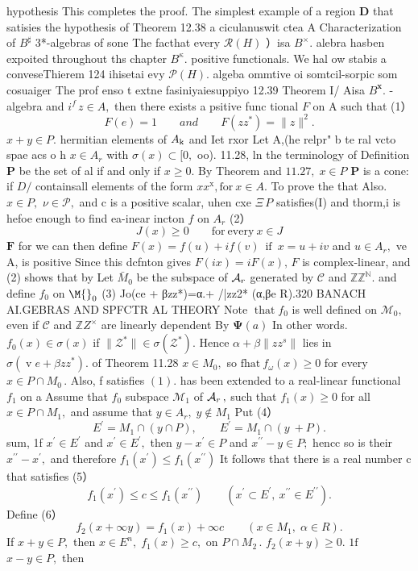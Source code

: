 hypothesis This completes the proof. The simplest example of a region ${\boldsymbol{D}}$ that satisies the hypothesis of Theorem 12.38 a ciculanuswit ctea A Characterization of $B^{\sharp}$ 3*-algebras of sone The facthat every ${\mathcal{R}}(H)$ ）isa $B^{\times}.$ alebra hasben expoited throughout ths chapter $B^{\kappa}.$ positive functionals. We hal ow stabis a conveseThierem 124 ihisetai evy ${\mathcal{P}}(H).$ algeba ommtive oi somtcil-sorpic som cosuaiger The prof enso t extne fasiniyaiesuppiyo 12.39 Theorem I/ Aisa $B^{\mathbf{x}}.$ -algebra and $i^{f}\,z\in A,$ then there exists a psitive func tional ${\mathbf{}}F$ on A such that (1） $$ F(e)=1\qquad a n d\qquad F(z z^{*})=\|z\|^{2}. $$ $x+y\in P.$ hermitian elements of $A_{\mathrm{\scriptsize{k}}}$ and Iet rxor Let A,(he relpr" b te ral vcto spae acs o h $x\in A_{r}$ with $\sigma(x)\subset[0,$ oo). 11.28, ln the terminology of Definition $\boldsymbol{P}$ be the set of al if and only if $x\geq0.$ By Theorem and $11.27,\;x\in P$ ${\boldsymbol{P}}$ is a cone: if $D\!\!\!\!/$ containsall elements of the form $x x^{\mathrm{x}},\mathrm{for}\ x\in A.$ To prove the that Also. $x\in P,$ $\nu\in{\mathcal{P}},$ and c is a positive scalar, uhen cxe $\Xi\,P$ satisfies(I) and thorm,i is hefoe enough to find ea-inear incton $\boldsymbol{\mathit{f}}$ on ${\mathit{A}}_{r}$ (2） $$ J(x)\geq0\qquad{\mathrm{for~every~}}x\in J $$ ${\boldsymbol{F}}$ for we can then define $F(x)=f(u)+i f(v)\,\,\,\mathrm{if}\,\,\,x=u+i v$ and $u\in A_{r},$ ve A, is positive Since this dcfnton gives $F(i x)=i F(x),\,F$ is complex-linear, and (2) shows that by Let $\bar{M}_{0}$ be the subspace of ${\cal A}_{r}$ generated by $\scriptstyle{\mathcal{C}}$ and $\mathbb{Z}\mathbb{Z}^{\mathbb{N}}.$ and define $f_{0}$ on $\M{}_{0}$ (3) Jo(ce + βzz*)=α.+ /|zz2* (α,βe R).320 BANACH AI.GEBRAS AND SPFCTR AL THEORY Note $\operatorname{that}f_{0}$ is well defined on $\mathcal{M}_{0},$ even if $\scriptstyle{\mathcal{C}}$ and $\mathbb{Z}Z^{\times}$ are linearly dependent By $\mathbf{\Psi}(a)$ In other words. $f_{0}(x)\in\sigma(x)$ if $\|{\mathcal{Z}}^{*}\|\in\sigma({\mathcal{Z}}^{*}).$ Hence $\alpha+\beta\|z z^{s}\|$ lies in $\sigma(\operatorname{v}e+\beta z z^{*}).$ of Theorem 11.28 $x\in M_{0},$ so ${\mathrm{fhat~}}f_{\omega}(x)\geq0$ for every $x\in P\cap M_{0}\,.$ Also, f satisfies $(1).$ has been extended to a real-linear functional $f_{1}$ on a Assume that $f_{0}$ subspace ${\mathcal{M}}_{1}$ of ${\cal A}_{r}\,,$ such that $f_{1}(x)\geq0$ for all $x\in P\cap M_{1},$ and assume that $y\in A_{r},\;y\notin M_{1}$ Put (4） $$ E^{'}=M_{1}\cap(y\cap P),\qquad E^{'}=M_{1}\cap(y\ +P). $$ sum, 1f $x^{\prime}\in E^{\prime}$ and $x^{\prime}\in E^{\prime},$ then $y-x^{\prime}\in P$ and $x^{\prime\prime}-y\in P;$ hencc so is their $x^{\prime\prime}-x^{\prime},$ and therefore $f_{1}(x^{\prime})\leq f_{1}(x^{\prime\prime})$ It follows that there is a real number c that satisfies (5） $$ f_{1}(x^{\prime})\leq c\leq f_{1}(x^{\prime\prime})\qquad(x^{\prime}\subset E^{\prime},\ x^{\prime\prime}\in E^{\prime\prime}). $$ Define (6） $$ f_{2}(x+\infty y)=f_{1}(x)+\infty c\qquad(x\in M_{1},\;\alpha\in R). $$ If $x+y\in P,$ then $x\in E^{n},\;f_{1}(x)\geq c,$ on $P\cap M_{2}\,.$ $f_{2}(x+y)\geq0.$ $1{\mathrm{f}}$ $x-y\in P,$ then 